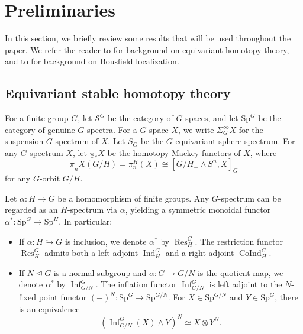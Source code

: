 \documentclass{amsart}
\theoremstyle{plain}
\theoremstyle{definition}
\theoremstyle{remark}
\begin{document}
\section{Preliminaries}\label{Sec:Preliminaries}
In this section, we briefly review some results that will be used throughout the paper. We refer the reader to \cite{may1996equivariant,schwede2019lectures} for background on equivariant homotopy theory, and to \cite{bousfield1979localization,hill2019equivariant,carrick2022smashing} for background on Bousfield localization.

\subsection{Equivariant stable homotopy theory}
 For a finite group $G$, let $\mathcal{S}^G$ be the category of $G$-spaces, and let $\mathrm{Sp}^G$ be the category of genuine $G$-spectra. For a $G$-space $X$, we write $\Sigma_G^\infty X$ for the suspension $G$-spectrum of $X$. Let $S_G$ be the $G$-equivariant sphere spectrum. For any $G$-spectrum $X$, let $\underline{\pi}_* X$ be the homotopy Mackey functors of $X$, where
\[
\underline{\pi}_n X (G/H)=\pi_n^H(X) \cong [G/H_+\wedge S^n, X]_G
\]
for any $G$-orbit $G/H$.

Let $\alpha\colon H\to G$ be a homomorphism of finite groups. Any $G$-spectrum can be regarded as an $H$-spectrum via $\alpha$, yielding a symmetric monoidal functor $\alpha^*\colon \mathrm{Sp}^G \to \mathrm{Sp}^H$.
In particular:
\begin{itemize}
\item[(1)] If $\alpha:H\hookrightarrow G$ is inclusion, we denote $\alpha^*$ by $\operatorname{Res}_H^G$. The restriction functor $\operatorname{Res}_H^G$ admits both a left adjoint $\operatorname{Ind}_H^G$ and a right adjoint $\operatorname{CoInd}_H^G$.
\item[(2)] If $N\trianglelefteq G$ is a normal subgroup and $\alpha\colon G\to G/N$ is the quotient map, we denote $\alpha^*$ by $\operatorname{Inf}_{G/N}^G$. The inflation functor $\operatorname{Inf}_{G/N}^G$ is left adjoint to the $N$-fixed point functor
$(-)^N\colon \mathrm{Sp}^G \to \mathrm{Sp}^{G/N}$. 
For $X\in \mathrm{Sp}^{G/N}$ and $Y\in \mathrm{Sp}^G$, there is an equivalence
\[(\operatorname{Inf}_{G/N}^G(X)\wedge Y)^N\simeq X\otimes Y^N.\]
\end{itemize}
\end{document}

